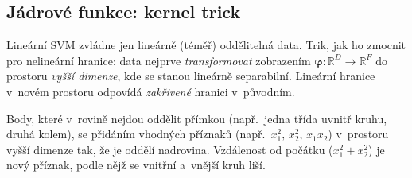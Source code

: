 \subsection{Jádrové funkce: kernel trick}

Lineární SVM zvládne jen lineárně (téměř) oddělitelná data. Trik, jak ho zmocnit pro nelineární hranice: data nejprve \emph{transformovat} zobrazením $\boldsymbol{\varphi}\colon\mathbb{R}^D\to\mathbb{R}^{F}$ do prostoru \emph{vyšší dimenze}, kde se stanou lineárně separabilní. Lineární hranice v~novém prostoru odpovídá \emph{zakřivené} hranici v~původním.

\begin{intuice}
Body, které v~rovině nejdou oddělit přímkou (např.\ jedna třída uvnitř kruhu, druhá kolem), se přidáním vhodných příznaků (např.\ $x_1^2,\,x_2^2,\,x_1x_2$) v~prostoru vyšší dimenze  tak, že je oddělí nadrovina. Vzdálenost od počátku ($x_1^2+x_2^2$) je nový příznak, podle nějž se vnitřní a~vnější kruh liší.
\end{intuice}

